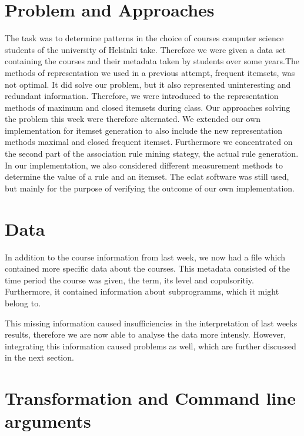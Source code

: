 



\section{Problem and Approaches}
The task was to determine patterns in the choice of courses computer science students of the 
university of Helsinki take. Therefore we were given a data set containing the courses and their 
metadata taken by students over some years.The methods of representation we used in a previous 
attempt, frequent itemsets, was not optimal. It did solve our problem, but it also represented 
uninteresting and redundant information. Therefore, we were introduced to the representation methods
of maximum and closed itemsets during class.
\newline
Our approaches solving the problem this week were therefore alternated. We extended our own 
implementation for itemset generation to also include the new representation methods maximal and 
closed frequent itemset. Furthermore we concentrated on the second part of the association rule 
mining stategy, the actual rule generation. In our implementation, we also considered different 
measurement methods to determine the value of a rule and an itemset.
\newline
The eclat software was still used, but mainly for the purpose of verifying the outcome of our own 
implementation.

\section{Data}

In addition to the course information from last week, we now had a file which contained more
specific data about the courses. This metadata consisted of the time period the course was given,
the term, its level and copulsoritiy. Furthermore, it contained information about subprogramms,
which it might belong to.

This missing information caused insufficiencies in the interpretation of last weeks results, 
therefore we are now able to analyse the data more intensly.
However, integrating this information caused problems as well, which are further discussed in 
the next section.

\section{Transformation and Command line arguments}


